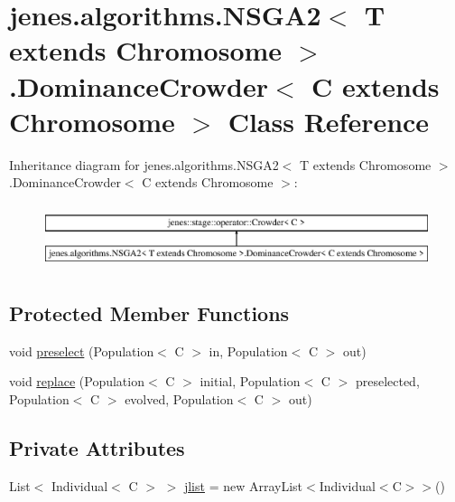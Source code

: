 \hypertarget{classjenes_1_1algorithms_1_1_n_s_g_a2_3_01_t_01extends_01_chromosome_01_4_1_1_dominance_crowder_a9a2fee645e4624e57f18141d651cc84}{\section{jenes.\-algorithms.\-N\-S\-G\-A2$<$ T extends Chromosome $>$.Dominance\-Crowder$<$ C extends Chromosome $>$ Class Reference}
\label{classjenes_1_1algorithms_1_1_n_s_g_a2_3_01_t_01extends_01_chromosome_01_4_1_1_dominance_crowder_a9a2fee645e4624e57f18141d651cc84}
}
Inheritance diagram for jenes.\-algorithms.\-N\-S\-G\-A2$<$ T extends Chromosome $>$.Dominance\-Crowder$<$ C extends Chromosome $>$\-:\begin{figure}[H]
\begin{center}
\leavevmode
\includegraphics[height=1.901528cm]{classjenes_1_1algorithms_1_1_n_s_g_a2_3_01_t_01extends_01_chromosome_01_4_1_1_dominance_crowder_a9a2fee645e4624e57f18141d651cc84}
\end{center}
\end{figure}
\subsection*{Protected Member Functions}
\begin{DoxyCompactItemize}
\item 
void \hyperlink{classjenes_1_1algorithms_1_1_n_s_g_a2_3_01_t_01extends_01_chromosome_01_4_1_1_dominance_crowder_a9a2fee645e4624e57f18141d651cc84_ae7cc8910724464b953eaa6e9b732ac6e}{preselect} (Population$<$ C $>$ in, Population$<$ C $>$ out)
\item 
void \hyperlink{classjenes_1_1algorithms_1_1_n_s_g_a2_3_01_t_01extends_01_chromosome_01_4_1_1_dominance_crowder_a9a2fee645e4624e57f18141d651cc84_a8e2309976ef03472ad6c0eb7879097ce}{replace} (Population$<$ C $>$ initial, Population$<$ C $>$ preselected, Population$<$ C $>$ evolved, Population$<$ C $>$ out)
\end{DoxyCompactItemize}
\subsection*{Private Attributes}
\begin{DoxyCompactItemize}
\item 
List$<$ Individual$<$ C $>$ $>$ \hyperlink{classjenes_1_1algorithms_1_1_n_s_g_a2_3_01_t_01extends_01_chromosome_01_4_1_1_dominance_crowder_a9a2fee645e4624e57f18141d651cc84_ad7314a1145b464c06c62b2f9b123fdda}{jlist} = new Array\-List$<$Individual$<$C$>$$>$()
\end{DoxyCompactItemize}


